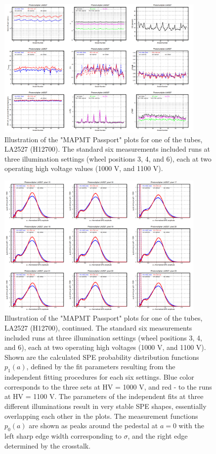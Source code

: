 \begin{figure}[!ht]
	\centering
	\includegraphics[width=0.9\textwidth,height=.55\textwidth]{figures/pavel_temp/LA2527_passport_temp.png}
	\caption{Illustration of the "MAPMT Passport" plots for one of the tubes, LA2527 (H12700). The standard six measurements included runs at three illumination settings (wheel positions 3, 4, and 6), each at two operating high voltage values (1000 V, and 1100 V).}
	\label{fig:LA2527_passport}
\end{figure}
\begin{figure}[!ht]
	\centering
	\includegraphics[width=0.9\textwidth,height=.55\textwidth]{figures/pavel_temp/LA2527_spectra_temp.png}
	\caption{Illustration of the "MAPMT Passport" plots for one of the tubes, LA2527 (H12700), continued. The standard six measurements included runs at three illumination settings (wheel positions 3, 4, and 6), each at two operating high voltages (1000 V, and 1100 V). Shown are the calculated SPE probability distribution functions $p_1(a)$, defined by the fit parameters resulting from the independent fitting procedures for each six settings. Blue color corresponds to the three sets at HV = 1000 V, and red - to the runs at HV = 1100 V. The parameters of the independent fits at three different illuminations result in very stable SPE shapes, essentially overlapping each other in the plots. The measurement functions $p_0(a)$ are shown as peaks around the pedestal at $a=0$ with the left sharp edge width corresponding to $\sigma$, and the right edge determined by the crosstalk.}
	\label{fig:LA2527_passport_spectra}
\end{figure}

